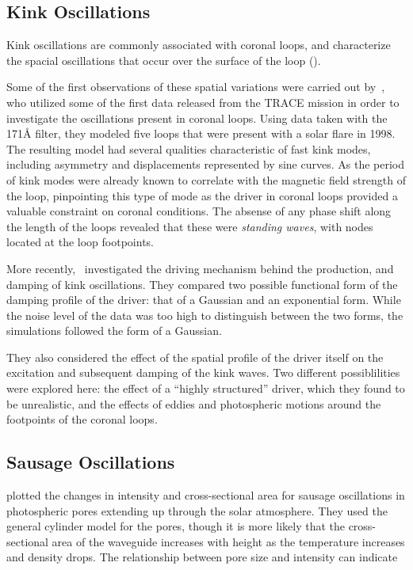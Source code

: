 \documentclass[preprint2]{aastex}
\begin{document}
\subsection{Kink Oscillations}
Kink oscillations are commonly associated with coronal loops, and
characterize the spacial oscillations that occur over the surface of
the loop (\cite{Nak}).



Some of the first observations of these spatial variations
were carried out by~\cite{kink_1},
who utilized some of the first data released from the TRACE mission in
order to investigate the oscillations present in coronal loops.
Using data taken with the 171\AA{} filter, they modeled five loops that
were present with a solar flare in 1998.
The resulting model had several qualities characteristic of
fast kink modes, including asymmetry
and
displacements represented by sine curves.
As the period of kink modes were already known to correlate
with the magnetic field strength of the loop, pinpointing this
type of mode as the driver in coronal loops provided a valuable
constraint on coronal conditions.
The absense of any phase
shift along the length of the loops revealed that these were
\emph{standing waves}, with nodes located at the loop footpoints.

More recently,~\cite{kink_2} investigated the driving mechanism
behind the production, and damping of kink oscillations.
They compared two possible functional form of the damping profile
of the driver: that of a Gaussian and an exponential form.
While the noise level of the data was too high to distinguish
between the two forms, the simulations followed the form of a
Gaussian.

They also considered the effect of the spatial profile of the driver
itself on the excitation and subsequent damping of the kink
waves. Two different possiblilities were explored here:
the effect of a ``highly structured'' driver, which they
found to be unrealistic, and the effects of eddies and photospheric
motions around the footpoints of the coronal loops.



\subsection{Sausage Oscillations}
\cite{sausage_1} plotted the changes in intensity and cross-sectional
area for sausage oscillations in photospheric pores extending up
through the solar atmosphere. They used the general cylinder model for
the pores, though it is more likely that the cross-sectional area of
the waveguide increases with height as the temperature increases and
density drops. The relationship between pore size and intensity can
indicate
\end{document}
